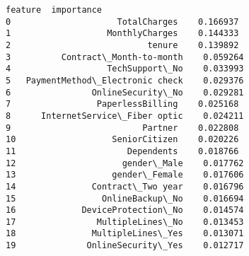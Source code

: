 \documentclass[11pt]{article}
\begin{document}
    
    \begin{Verbatim}[commandchars=\\\{\}]
                           feature  importance
0                     TotalCharges    0.166937
1                   MonthlyCharges    0.144333
2                           tenure    0.139892
3          Contract\_Month-to-month    0.059264
4                   TechSupport\_No    0.033993
5   PaymentMethod\_Electronic check    0.029376
6                OnlineSecurity\_No    0.029281
7                 PaperlessBilling    0.025168
8      InternetService\_Fiber optic    0.024211
9                          Partner    0.022808
10                   SeniorCitizen    0.020226
11                      Dependents    0.018766
12                     gender\_Male    0.017762
13                   gender\_Female    0.017606
14               Contract\_Two year    0.016796
15                 OnlineBackup\_No    0.016694
16             DeviceProtection\_No    0.014574
17                MultipleLines\_No    0.013453
18               MultipleLines\_Yes    0.013071
19              OnlineSecurity\_Yes    0.012717
    \end{Verbatim}

    
    \begin{center}
    \end{center}
    { \hspace*{\fill} \\}
    
\end{document}
